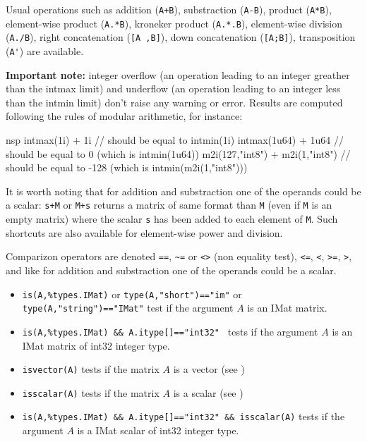 
Usual operations such as addition (\verb-A+B-), substraction  (\verb+A-B+), product (\verb+A*B+), 
element-wise product (\verb+A.*B+), kroneker product (\verb+A.*.B+),
element-wise division (\verb+A./B+), right concatenation  (\verb+[A ,B]+), down concatenation  (\verb+[A;B]+), 
transposition (\verb+A'+) are available. 

{\bf Important note:} integer overflow (an operation leading to an integer greather than
the intmax limit) and underflow  (an operation leading to an integer less than
the intmin limit) don't raise any warning or error. Results are computed following the
rules of modular arithmetic, for instance:
\begin{mintednsp}{nsp}
intmax(1i) + 1i  // should be equal to intmin(1i)
intmax(1u64) + 1u64 // should be equal to 0 (which is intmin(1u64))
m2i(127,"int8") + m2i(1,"int8")  // should be equal to -128  (which is intmin(m2i(1,"int8")))
\end{mintednsp}

It is worth noting that for addition and substraction one of the operands could be a scalar:
\verb=s+M= or \verb=M+s= returns a matrix of same format than \verb+M+
(even if \verb+M+ is an empty matrix) where the scalar \verb=s= has been added to each
element of \verb+M+. Such shortcuts are also available for element-wise power and division. 

Comparizon operators are denoted \verb+==+, \verb+~=+ or  \verb+<>+ (non equality test), 
\verb+<=+, \verb+<+, \verb+>=+, \verb+>+, and like for  addition and substraction one of
the operands could be a scalar. 

\begin{itemize}
    \item \verb+is(A,%types.IMat)+ or \verb+type(A,"short")=="im"+ or \verb+type(A,"string")=="IMat"+ 
     test if the argument $A$ is an IMat matrix.
    \item \verb+is(A,%types.IMat) && A.itype[]=="int32" + tests if the argument $A$ is an IMat matrix of int32 integer type.
    \item \verb+isvector(A)+ tests if the matrix $A$ is a vector (see )
    \item \verb+isscalar(A)+ tests if the matrix $A$ is a scalar (see )
    \item \verb+is(A,%types.IMat) && A.itype[]=="int32" && isscalar(A)+ tests if the argument $A$ is a IMat scalar of
                     int32 integer type.
\end{itemize}

